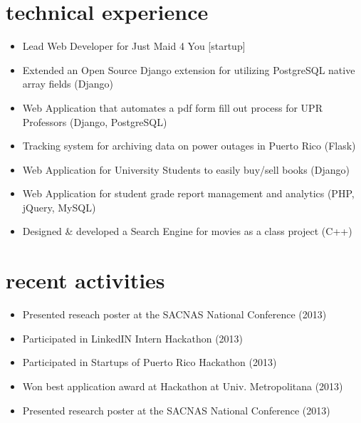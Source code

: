 \documentclass[]{friggeri-cv}
\begin{document}
\section{technical experience}

\begin{itemize}
\item Lead Web Developer for Just Maid 4 You [startup]
\item Extended an Open Source Django extension for utilizing PostgreSQL native array fields (Django)
\item Web Application that automates a pdf form fill out process for UPR Professors (Django,
PostgreSQL)
\item Tracking system for archiving data on power outages in Puerto Rico (Flask)
\item Web Application for University Students to easily buy/sell books (Django)
\item Web Application for student grade report management and analytics (PHP, jQuery, MySQL)
\item Designed \& developed a Search Engine for movies as a class project (C++)
\end{itemize}


\section{recent activities}
\begin{itemize}
\item Presented reseach poster at the SACNAS National Conference (2013)
\item Participated in LinkedIN Intern Hackathon (2013)
\item Participated in Startups of Puerto Rico Hackathon (2013)
\item Won best application award at Hackathon at Univ. Metropolitana (2013)
\item Presented research poster at the SACNAS National Conference (2013)
\end{itemize}
\end{document}
